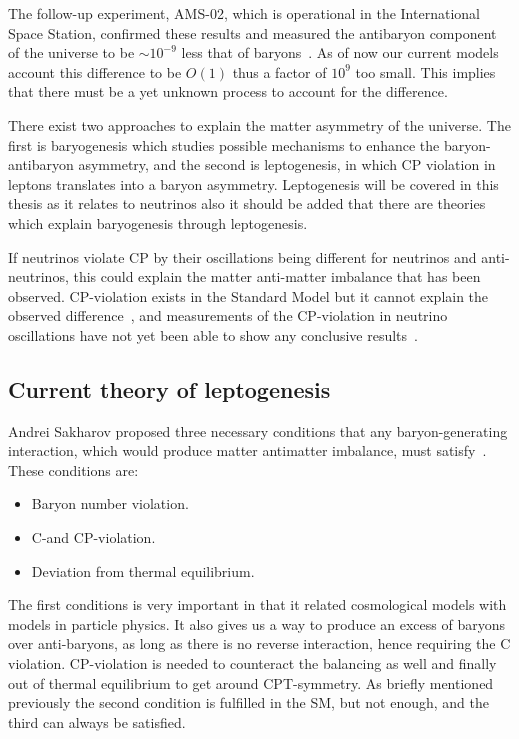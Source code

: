 The follow-up experiment, AMS-02, which is operational in the International Space Station, confirmed these results and measured the antibaryon component of the universe to be $\sim 10^{-9}$ less that of baryons~\cite{16AMS2}. As of now our current models account this difference to be $O(1)$ thus a factor of $10^9$ too small\cite{49Matter}. This implies that there must be a yet unknown process to account for the difference.

There exist two approaches to explain the matter asymmetry of the universe. The first is baryogenesis which studies possible mechanisms to enhance the baryon-antibaryon asymmetry, and the second is leptogenesis, in which CP violation in leptons translates into a baryon asymmetry. Leptogenesis will be covered in this thesis as it relates to neutrinos also it should be added that there are theories which explain baryogenesis through leptogenesis.

If neutrinos violate CP by their oscillations being different for neutrinos and anti-neutrinos, this could explain the matter anti-matter imbalance that has been observed. CP-violation exists in the Standard Model but it cannot explain the observed difference~\cite{3Peskin}, and measurements of the CP-violation in neutrino oscillations have not yet been able to show any conclusive results~\cite{17Gonzalez}.

\subsection{Current theory of leptogenesis}
Andrei Sakharov proposed three necessary conditions that any baryon-generating interaction, which would produce matter antimatter imbalance, must satisfy~\cite{37Sakharov}. These conditions are:
\begin{itemize}
\item Baryon number violation.
\item C-and CP-violation.
\item Deviation from thermal equilibrium.
\end{itemize}

The first conditions is very important in that it related cosmological models with models in particle physics. It also gives us a way to produce an excess of baryons over anti-baryons, as long as there is no reverse interaction, hence requiring the C violation. CP-violation is needed to counteract the balancing as well and finally out of thermal equilibrium to get around CPT-symmetry. As briefly mentioned previously the second condition is fulfilled in the SM, but not enough, and the third can always be satisfied.

